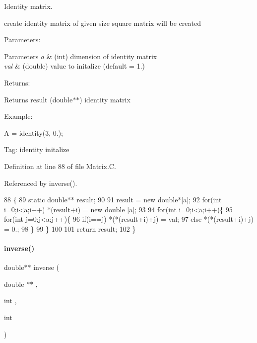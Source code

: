 Identity matrix. 

create identity matrix of given size square matrix will be created

Parameters\+: 
\begin{DoxyParams}{Parameters}
{\em a} & (int) dimension of identity matrix \\
\hline
{\em val} & (double) value to initalize (default = 1.)\\
\hline
\end{DoxyParams}
Returns\+: \begin{DoxyReturn}{Returns}
result (double$\ast$$\ast$) identity matrix
\end{DoxyReturn}
Example\+:

A = identity(3, 0.);

Tag\+: identity initalize 

Definition at line 88 of file Matrix.\+C.



Referenced by inverse().


\begin{DoxyCode}
88                                     \{
89     \textcolor{keyword}{static} \textcolor{keywordtype}{double}** result;
90 
91     result = \textcolor{keyword}{new} \textcolor{keywordtype}{double}*[a];
92     \textcolor{keywordflow}{for}(\textcolor{keywordtype}{int} i=0;i<a;i++) *(result+i) = \textcolor{keyword}{new} \textcolor{keywordtype}{double} [a];
93 
94     \textcolor{keywordflow}{for}(\textcolor{keywordtype}{int} i=0;i<a;i++)\{
95         \textcolor{keywordflow}{for}(\textcolor{keywordtype}{int} j=0;j<a;j++)\{
96             \textcolor{keywordflow}{if}(i==j) *(*(result+i)+j) = val;
97             \textcolor{keywordflow}{else} *(*(result+i)+j) = 0.;
98         \}
99     \}
100 
101     \textcolor{keywordflow}{return} result;
102 \}
\end{DoxyCode}
\mbox{\label{Matrix_8C_a19adaf60a005ffeb9071a395d0ee069f}} 
\paragraph{\texorpdfstring{inverse()}{inverse()}}
{\footnotesize\ttfamily double$\ast$$\ast$ inverse (\begin{DoxyParamCaption}\item[{double $\ast$$\ast$}]{,  }\item[{int}]{,  }\item[{int}]{ }\end{DoxyParamCaption})}



